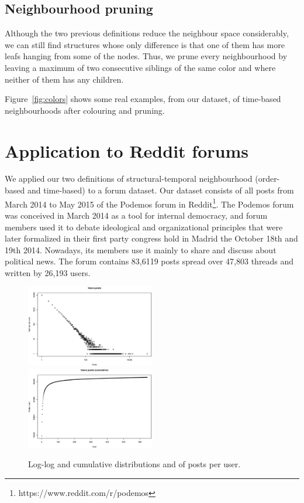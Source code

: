\documentclass[conference]{IEEEtran}
\begin{document}
\subsection{Neighbourhood pruning}\label{sec:pruning}
Although the two previous definitions reduce the neighbour space considerably, we can still find structures whose only difference is that one of them has more leafs hanging from some of the nodes. Thus, we prune every neighbourhood by leaving a maximum of two consecutive siblings of the same color and where neither of them has any children.

Figure~\ref{fig:colors} shows some real examples, from our dataset, of time-based neighbourhoods after colouring and pruning.

\section{Application to Reddit forums}
We applied our two definitions of structural-temporal neighbourhood (order-based and time-based) to a forum dataset. Our dataset consists of all posts from March 2014 to May 2015 of the Podemos forum in Reddit\footnote{https://www.reddit.com/r/podemos}. The Podemos forum was conceived in March 2014 as a tool for internal democracy, and forum members used it to debate ideological and organizational principles that were later formalized in their first party congress hold in Madrid the October 18th and 19th 2014. Nowadays, its members use it mainly to share and discuss about political news.
The forum contains 83,6119 posts spread over 47,803 threads and written by 26,193 users.

\begin{figure}
\centering
\includegraphics[width=0.5\textwidth]{users_posts}%
\includegraphics[width=0.5\textwidth]{users_posts_cum}
\caption{Log-log and cumulative distributions and of posts per user.}
\label{fig:podemos_distributions}
\end{figure}
\end{document}
